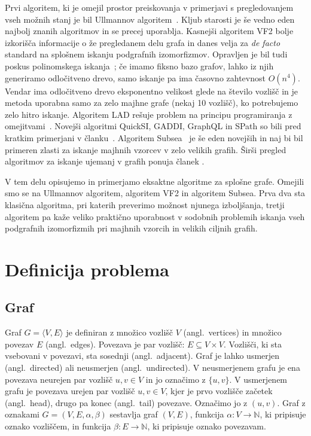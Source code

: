 \documentclass[a4paper, 12pt, ]{book}
\begin{document}
 Prvi algoritem, ki je omejil prostor preiskovanja v primerjavi s pregledovanjem vseh možnih stanj
 je bil Ullmannov algoritem~\cite{ullmann}. Kljub starosti je še vedno eden najbolj znanih algoritmov
 in se precej uporablja. Kasnejši algoritem VF2 \cite{vf2, vf2_3, vf2_2} bolje izkorišča
 informacije o že pregledanem delu grafa in danes velja za \textit{de facto} standard na splošnem iskanju
 podgrafnih izomorfizmov. Opravljen je bil tudi poskus polinomskega iskanja~\cite{poly}; če imamo
 fiksno bazo grafov, lahko iz njih generiramo odločitveno drevo, samo iskanje pa ima časovno zahtevnost
 $O(n^4)$. Vendar ima odločitveno drevo eksponentno velikost glede na število vozlišč in je metoda
 uporabna samo za zelo majhne grafe (nekaj 10 vozlišč), ko potrebujemo zelo hitro iskanje. Algoritem
 LAD rešuje problem na principu programiranja z omejitvami~\cite{alldiff, zampelli-th}. Novejši algoritmi
 QuickSI,  GADDI, GraphQL in SPath so bili pred kratkim primerjani v članku~\cite{indepth}. Algoritem
 Subsea~\cite{subsea} je še eden novejših in naj bi bil primeren zlasti za iskanje majhnih vzorcev v zelo
 velikih grafih. Širši pregled algoritmov za iskanje ujemanj v grafih ponuja članek \cite{thirtyyears}.
  
 V tem delu opisujemo in primerjamo eksaktne algoritme za splošne grafe. Omejili smo se na Ullmannov
 algoritem, algoritem VF2 in algoritem Subsea. Prva dva sta klasična algoritma, pri katerih preverimo možnost
 njunega izboljšanja, tretji algoritem pa kaže veliko praktično uporabnost v sodobnih problemih iskanja
 vseh podgrafnih izomorfizmih pri majhnih vzorcih in velikih ciljnih grafih.
  
  


\chapter{Definicija problema}

	\section{Graf}
	Graf $G = \langle V, E \rangle$ je definiran z množico vozlišč $V$ (angl.~vertices) in množico povezav $E$ (angl.~edges). Povezava je par vozlišč: 
	$E \subseteq V \times V$.
	Vozlišči, ki sta vsebovani v povezavi, sta sosednji (angl.~adjacent). Graf je lahko usmerjen (angl.~directed) ali neusmerjen
	(angl.~undirected). V neusmerjenem
	grafu je ena povezava neurejen par vozlišč $u, v \in V$ in jo označimo z $\{u, v\}$. V usmerjenem grafu je povezava urejen par 
	vozlišč $u, v \in V$, kjer je prvo vozlišče začetek (angl.~head), drugo pa konec (angl.~tail) povezave. Označimo jo z $(u, v)$.
	Graf z oznakami $G = (V, E, \alpha, \beta)$ sestavlja graf $(V, E)$, funkcija $\alpha: V \to \mathbb{N} $, ki pripisuje oznako
	vozliščem, in funkcija $\beta: E \rightarrow \mathbb{N}$, ki pripisuje oznako povezavam.
\end{document}
